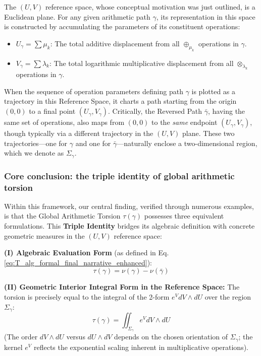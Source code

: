 The $(U,V)$ reference space, whose conceptual motivation was just outlined, is a Euclidean plane. For any given arithmetic path $\gamma$, its representation in this space is constructed by accumulating the parameters of its constituent operations:
\begin{itemize}
    \item $U_\gamma = \sum \mu_k$: The total additive displacement from all $\oplus_{\mu_k}$ operations in $\gamma$.
    \item $V_\gamma = \sum \lambda_k$: The total logarithmic multiplicative displacement from all $\otimes_{\lambda_k}$ operations in $\gamma$.
\end{itemize}
When the sequence of operation parameters defining path $\gamma$ is plotted as a trajectory in this Reference Space, it charts a path starting from the origin $(0,0)$ to a final point $(U_\gamma, V_\gamma)$. Critically, the Reversed Path $\bar{\gamma}$, having the same set of operations, also maps from $(0,0)$ to the \textit{same} endpoint $(U_\gamma, V_\gamma)$, though typically via a different trajectory in the $(U,V)$ plane. These two trajectories---one for $\gamma$ and one for $\bar{\gamma}$---naturally enclose a two-dimensional region, which we denote as $\Sigma_\gamma$.

\subsubsection*{Core conclusion: the triple identity of global arithmetic torsion}

Within this framework, our central finding, verified through numerous examples, is that the Global Arithmetic Torsion $\tau(\gamma)$ possesses three equivalent formulations. This \textbf{Triple Identity} bridges its algebraic definition with concrete geometric measures in the $(U,V)$ reference space:

\textbf{(I) Algebraic Evaluation Form} (as defined in Eq. \ref{eq:T_alg_formal_final_narrative_enhanced}):
\[ \tau(\gamma) = \nu(\gamma) - \nu(\bar{\gamma}) \]

\textbf{(II) Geometric Interior Integral Form in the Reference Space:}
The torsion is precisely equal to the integral of the 2-form $e^V dV \wedge dU$ over the region $\Sigma_\gamma$:
\[ \tau(\gamma) = \iint_{\Sigma_\gamma} e^V dV \wedge dU \]
(The order $dV \wedge dU$ versus $dU \wedge dV$ depends on the chosen orientation of $\Sigma_\gamma$; the kernel $e^V$ reflects the exponential scaling inherent in multiplicative operations).

